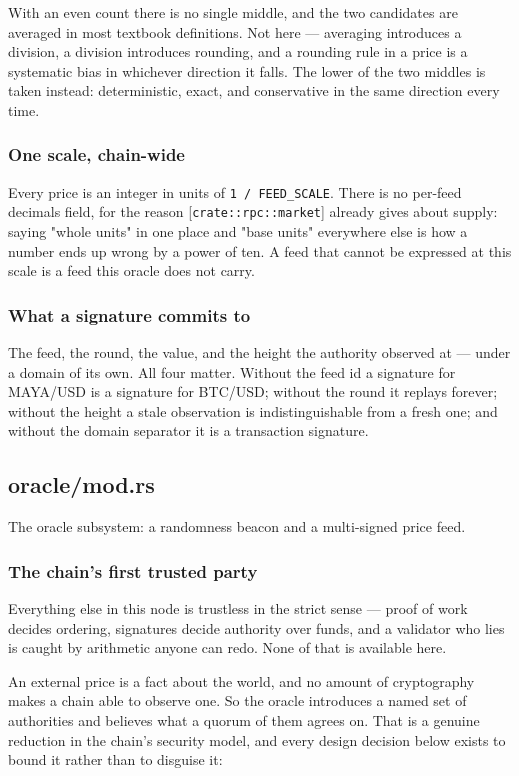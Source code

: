 \documentclass[11pt,a4paper]{article}
\begin{document}
With an even count there is no single middle, and the two candidates are
averaged in most textbook definitions. Not here — averaging introduces a
division, a division introduces rounding, and a rounding rule in a price is
a systematic bias in whichever direction it falls. The lower of the two
middles is taken instead: deterministic, exact, and conservative in the same
direction every time.

\subsubsection{One scale, chain-wide}

Every price is an integer in units of \texttt{1 / FEED\_SCALE}. There is no
per-feed decimals field, for the reason [\texttt{crate::rpc::market}] already gives
about supply: saying "whole units" in one place and "base units" everywhere
else is how a number ends up wrong by a power of ten. A feed that cannot be
expressed at this scale is a feed this oracle does not carry.

\subsubsection{What a signature commits to}

The feed, the round, the value, and the height the authority observed at —
under a domain of its own. All four matter. Without the feed id a signature
for MAYA/USD is a signature for BTC/USD; without the round it replays
forever; without the height a stale observation is indistinguishable from a
fresh one; and without the domain separator it is a transaction signature.

\subsection{oracle/mod.rs}
The oracle subsystem: a randomness beacon and a multi-signed price feed.

\subsubsection{The chain's first trusted party}

Everything else in this node is trustless in the strict sense — proof of
work decides ordering, signatures decide authority over funds, and a
validator who lies is caught by arithmetic anyone can redo. None of that is
available here.

An external price is a fact about the world, and no amount of cryptography
makes a chain able to observe one. So the oracle introduces a named set of
authorities and believes what a quorum of them agrees on. That is a genuine
reduction in the chain's security model, and every design decision below
exists to bound it rather than to disguise it:
\end{document}
